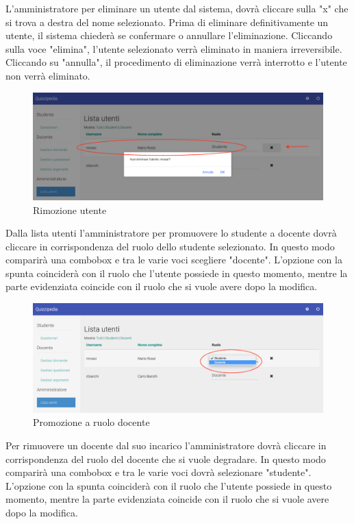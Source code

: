 \documentclass[12pt,a4paper]{article}
\begin{document}
	L'amministratore per eliminare un utente dal sistema, dovrà cliccare sulla "x" che si trova a destra del nome selezionato. Prima di eliminare definitivamente un utente, il sistema chiederà se confermare o annullare l'eliminazione. Cliccando sulla voce "elimina", l'utente selezionato verrà eliminato in maniera irreversibile. Cliccando su "annulla", il procedimento di eliminazione verrà interrotto e l'utente non verrà eliminato.
		\begin{figure}[H]
			\centering
			\includegraphics[width=1\linewidth]{../img/screenshot/rimozioneUtente.png}
			\caption{Rimozione utente}
			\label{Rimozione utente}
		\end{figure}
	Dalla lista utenti l'amministratore per promuovere lo studente a docente dovrà cliccare in corrispondenza del ruolo dello studente selezionato. In questo modo comparirà una combobox e tra le varie voci scegliere "docente". L'opzione con la spunta coinciderà con il ruolo che l'utente possiede in questo momento, mentre la parte evidenziata coincide con il ruolo che si vuole avere dopo la modifica.
	
	\begin{figure}[H]
		\centering
		\includegraphics[width=1\linewidth]{../img/screenshot/cambioRuoloStudDoc.png}
		\caption{Promozione a ruolo docente}
		\label{Promozione a ruolo docente}
	\end{figure}
	
	Per rimuovere un docente dal suo incarico l'amministratore dovrà cliccare in corrispondenza del ruolo del docente che si vuole degradare. In questo modo comparirà una combobox e tra le varie voci dovrà selezionare "studente".
	L'opzione con la spunta coinciderà con il ruolo che l'utente possiede in questo momento, mentre la parte evidenziata coincide con il ruolo che si vuole avere dopo la modifica.
	
\end{document}
